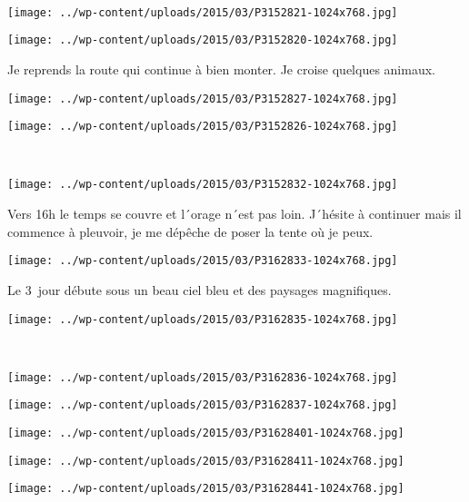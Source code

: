 \pagebreak
~\\
\begin{center} \texttt{[image: ../wp-content/uploads/2015/03/P3152821-1024x768.jpg]} \end{center}
\begin{center} \texttt{[image: ../wp-content/uploads/2015/03/P3152820-1024x768.jpg]} \end{center}
\vspace{-\topsep}
\vspace{-3mm}

\pagebreak
 Je reprends la route qui continue à bien monter. Je croise quelques animaux.
\begin{center} \texttt{[image: ../wp-content/uploads/2015/03/P3152827-1024x768.jpg]} \end{center}
\begin{center} \texttt{[image: ../wp-content/uploads/2015/03/P3152826-1024x768.jpg]} \end{center}
\vspace{-\topsep}
\vspace{-2.75mm}
\pagebreak
~
\vspace{1mm}
\begin{center} \texttt{[image: ../wp-content/uploads/2015/03/P3152832-1024x768.jpg]} \end{center}

 Vers 16h le temps se couvre et l´orage n´est pas loin. J´hésite à continuer mais il commence à pleuvoir, je me dépêche de poser la tente où je peux.
\begin{center} \texttt{[image: ../wp-content/uploads/2015/03/P3162833-1024x768.jpg]} \end{center}
\vspace{-\topsep}

\pagebreak
 Le 3\ieme\ jour débute sous un beau ciel bleu et des paysages magnifiques. 
\begin{center} \texttt{[image: ../wp-content/uploads/2015/03/P3162835-1024x768.jpg]} \end{center}
~\\
\begin{center} \texttt{[image: ../wp-content/uploads/2015/03/P3162836-1024x768.jpg]} \end{center}
\begin{center} \texttt{[image: ../wp-content/uploads/2015/03/P3162837-1024x768.jpg]} \end{center}
\begin{center} \texttt{[image: ../wp-content/uploads/2015/03/P31628401-1024x768.jpg]} \end{center}
\begin{center} \texttt{[image: ../wp-content/uploads/2015/03/P31628411-1024x768.jpg]} \end{center}
\vfill
\begin{center} \texttt{[image: ../wp-content/uploads/2015/03/P31628441-1024x768.jpg]} \end{center}
\vspace{-\topsep}
\vspace{-0.75mm}

